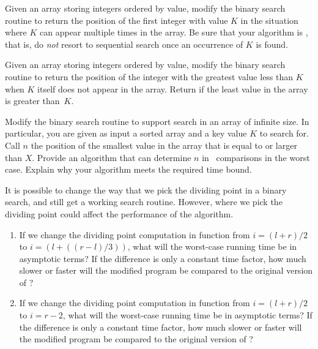 \begin{exercises}
\item
Given an array storing integers ordered by value,
modify the binary search routine to return the position of the first
integer with value \(K\) in the situation where \(K\) can appear
multiple times in the array.
Be sure that your algorithm is \Thetalogn, that is, do \emph{not}
resort to sequential search
once an occurrence of \(K\) is found.

\item
Given an array storing integers ordered by value,
modify the binary search routine to return the position of the
integer with the greatest value less than \(K\) when
\(K\) itself does not appear in the array.
Return  if the least value in the array is greater
than~\(K\).

\item
Modify the binary search routine to support search in an array of
infinite size.
In particular, you are given as input a sorted array and a key value
\(K\) to search for.
Call \(n\) the position of the smallest value in the array that is
equal to or larger than \(X\).
Provide an algorithm that can determine \(n\)
in \Ologn\ comparisons in the worst case.
Explain why your algorithm meets the required time bound.

\item
It is possible to change the way that we pick the dividing point in a
binary search, and still get a working search routine.
However, where we pick the dividing point could affect the performance
of the algorithm.

\begin{enumerate}
\item
If we change the dividing point computation in function
 from \(i = (l+r)/2\) to \(i = (l+((r-l)/3))\),
what will the worst-case running time be in asymptotic terms?
If the difference is only a constant time factor,
how much slower or faster will the modified program be compared to the
original version of ?

\item
If we change the dividing point computation in function
 from \(i = (l+r)/2\) to \(i = r-2\),
what will the worst-case running time be in asymptotic terms?
If the difference is only a constant time factor,
how much slower or faster will the modified program be compared to the
original version of ?
\end{enumerate}


\end{exercises}
